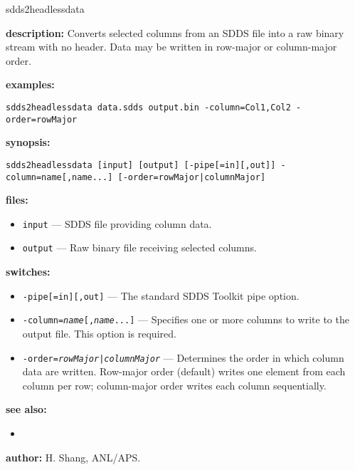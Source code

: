\begin{sddsprog}{sdds2headlessdata}
  \item \textbf{description:} Converts selected columns from an SDDS file into a raw binary stream with no header. Data may be written in row-major or column-major order.
  \item \textbf{examples:}
    \begin{verbatim}
sdds2headlessdata data.sdds output.bin -column=Col1,Col2 -order=rowMajor
    \end{verbatim}
  \item \textbf{synopsis:}
    \begin{verbatim}
sdds2headlessdata [input] [output] [-pipe[=in][,out]] -column=name[,name...] [-order=rowMajor|columnMajor]
    \end{verbatim}
  \item \textbf{files:}
    \begin{itemize}
    \item \verb|input| --- SDDS file providing column data.
    \item \verb|output| --- Raw binary file receiving selected columns.
    \end{itemize}
  \item \textbf{switches:}
    \begin{itemize}
    \item {\tt -pipe[=in][,out]} --- The standard SDDS Toolkit pipe option.
    \item {\tt -column=\emph{name}[,\emph{name}...]} --- Specifies one or more columns to write to the output file. This option is required.
    \item {\tt -order=\emph{rowMajor|columnMajor}} --- Determines the order in which column data are written. Row-major order (default) writes one element from each column per row; column-major order writes each column sequentially.
    \end{itemize}
  \item \textbf{see also:}
    \begin{itemize}
    \item {}
    \end{itemize}
  \item \textbf{author:} H. Shang, ANL/APS.
\end{sddsprog}
